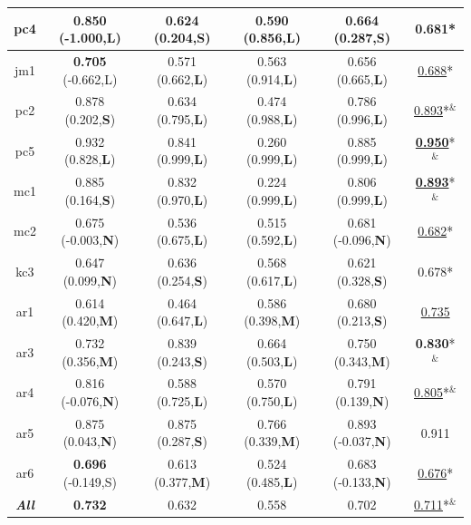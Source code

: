 \begin{table}[!t]
\begin{tabular}{|c||c|c|c|c||c|}
    pc4 &{\bf 0.850} (-1.000,L) &0.624 (0.204,{\bf S})  &0.590 (0.856,{\bf L})  &0.664 (0.287,{\bf S})  &0.681* \\ \hline
    jm1 &{\bf 0.705} (-0.662,L) &0.571 (0.662,{\bf L})  &0.563 (0.914,{\bf L})  &0.656 (0.665,{\bf L})  &\underline{0.688}* \\ \hline
    pc2 &0.878 (0.202,{\bf S})  &0.634 (0.795,{\bf L})  &0.474 (0.988,{\bf L})  &0.786 (0.996,{\bf L})  &\underline{0.893}*$^{\&}$ \\ \hline
    pc5 &0.932 (0.828,{\bf L})  &0.841 (0.999,{\bf L})  &0.260 (0.999,{\bf L})  &0.885 (0.999,{\bf L})  &\underline{{\bf 0.950}}*$^{\&}$ \\ \hline
    mc1 &0.885 (0.164,{\bf S})  &0.832 (0.970,{\bf L})  &0.224 (0.999,{\bf L})  &0.806 (0.999,{\bf L})  &\underline{{\bf 0.893}}*$^{\&}$ \\ \hline
    mc2 &0.675 (-0.003,{\bf N}) &0.536 (0.675,{\bf L})  &0.515 (0.592,{\bf L})  &0.681 (-0.096,{\bf N}) &\underline{0.682}* \\ \hline
    kc3 &0.647 (0.099,{\bf N})  &0.636 (0.254,{\bf S})  &0.568 (0.617,{\bf L})  &0.621 (0.328,{\bf S})  &0.678* \\ \hline
    ar1 &0.614 (0.420,{\bf M})  &0.464 (0.647,{\bf L})  &0.586 (0.398,{\bf M})  &0.680 (0.213,{\bf S})  &\underline{0.735} \\ \hline
    ar3 &0.732 (0.356,{\bf M})  &0.839 (0.243,{\bf S})  &0.664 (0.503,{\bf L})  &0.750 (0.343,{\bf M})  &{\bf 0.830}*$^{\&}$ \\ \hline
    ar4 &0.816 (-0.076,{\bf N}) &0.588 (0.725,{\bf L})  &0.570 (0.750,{\bf L})  &0.791 (0.139,{\bf N})  &\underline{0.805}*$^{\&}$ \\ \hline
    ar5 &0.875 (0.043,{\bf N})  &0.875 (0.287,{\bf S})  &0.766 (0.339,{\bf M})  &0.893 (-0.037,{\bf N}) &0.911 \\ \hline
    ar6 &{\bf 0.696} (-0.149,S) &0.613 (0.377,{\bf M})  &0.524 (0.485,{\bf L})  &0.683 (-0.133,{\bf N}) &\underline{0.676}* \\ \hline
    \hline
    {\bf {\em All}}     &{\bf 0.732}            &0.632          &0.558          &0.702          &\underline{0.711}*$^{\&}$ \\
		\hline



\end{tabular}
\end{table}

